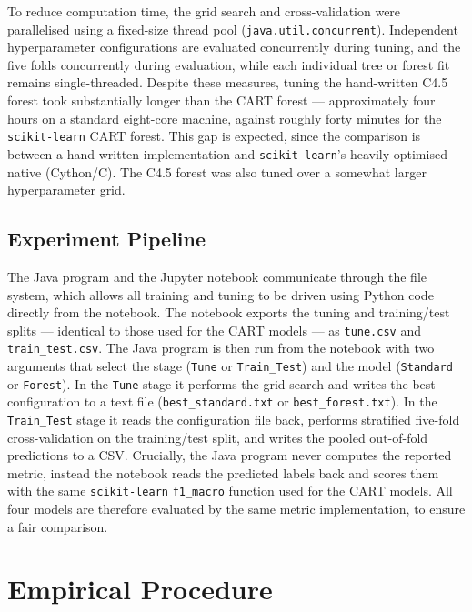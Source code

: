 \documentclass[conference]{IEEEtran}
\begin{document}
To reduce computation time, the grid search and cross-validation were parallelised using a
fixed-size thread pool (\texttt{java.util.concurrent}). Independent hyperparameter
configurations are evaluated concurrently during tuning, and the five folds concurrently during
evaluation, while each individual tree or forest fit remains single-threaded. Despite these measures,
tuning the hand-written C4.5 forest took substantially longer than the CART forest ---
approximately four hours on a standard eight-core machine, against roughly forty minutes for the
\texttt{scikit-learn} CART forest. This gap is expected, since the comparison is between a
hand-written implementation and \texttt{scikit-learn}'s heavily optimised native (Cython/C). 
The C4.5 forest was also tuned over a somewhat larger hyperparameter grid.

\subsection{Experiment Pipeline} %

The Java program and the Jupyter notebook communicate through the file system, which allows all
training and tuning to be driven using Python code directly from the notebook. The notebook exports
the tuning and training/test splits --- identical to those used for the CART models --- as
\texttt{tune.csv} and \texttt{train\_test.csv}. The Java program is then run from the notebook with two
arguments that select the stage (\texttt{Tune} or \texttt{Train\_Test}) and the model
(\texttt{Standard} or \texttt{Forest}). In the \texttt{Tune} stage it performs the grid search
and writes the best configuration to a text file (\texttt{best\_standard.txt}
or \texttt{best\_forest.txt}). 
In the \texttt{Train\_Test} stage it reads the configuration file back, performs
stratified five-fold cross-validation on the training/test split, and writes the pooled
out-of-fold predictions to a CSV. Crucially, the Java program never computes the reported metric, instead
the notebook reads the predicted labels back and scores them with the same \texttt{scikit-learn}
\texttt{f1\_macro} function used for the CART models. All four models are therefore evaluated by
the same metric implementation, to ensure a fair comparison.

\section{Empirical Procedure}
\end{document}
